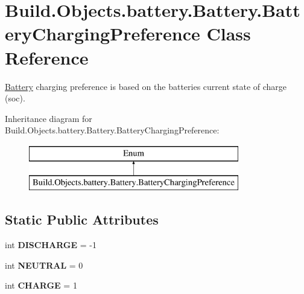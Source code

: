 \hypertarget{class_build_1_1_objects_1_1battery_1_1_battery_1_1_battery_charging_preference}{}\section{Build.\+Objects.\+battery.\+Battery.\+Battery\+Charging\+Preference Class Reference}
\label{class_build_1_1_objects_1_1battery_1_1_battery_1_1_battery_charging_preference}


\hyperlink{class_build_1_1_objects_1_1battery_1_1_battery}{Battery} charging preference is based on the batteries current state of charge (soc).  


Inheritance diagram for Build.\+Objects.\+battery.\+Battery.\+Battery\+Charging\+Preference\+:\begin{figure}[H]
\begin{center}
\leavevmode
\includegraphics[height=2.000000cm]{class_build_1_1_objects_1_1battery_1_1_battery_1_1_battery_charging_preference}
\end{center}
\end{figure}
\subsection*{Static Public Attributes}
\begin{DoxyCompactItemize}
\item 
\mbox{\label{class_build_1_1_objects_1_1battery_1_1_battery_1_1_battery_charging_preference_aaa23babf2d6aff6adbcc3b7baf0d2440}} 
int {\bfseries D\+I\+S\+C\+H\+A\+R\+GE} = -\/1
\item 
\mbox{\label{class_build_1_1_objects_1_1battery_1_1_battery_1_1_battery_charging_preference_a5f96446b511011dbdf8ecb18b90326d6}} 
int {\bfseries N\+E\+U\+T\+R\+AL} = 0
\item 
\mbox{\label{class_build_1_1_objects_1_1battery_1_1_battery_1_1_battery_charging_preference_a7b7f064478fffacefa906b9955426ecd}} 
int {\bfseries C\+H\+A\+R\+GE} = 1
\end{DoxyCompactItemize}


